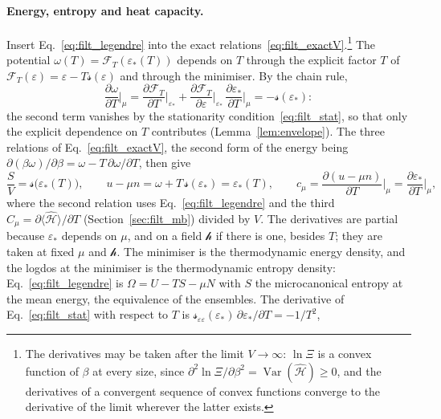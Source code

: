 \documentclass[10pt,a4paper]{article}
\theoremstyle{plain}
\newcommand{\Var}{\operatorname{Var}}
\newcommand{\lndos}{{logdos}}  %
\newcommand{\hfield}{\mathscr{h}}  %
\newcommand{\Fen}[1][T]{\mathscr{F}_{#1}}  %
\newcommand{\lds}{\mathscr{s}}  %
\begin{document}
\paragraph{Energy, entropy and heat capacity.} Insert
Eq.~\eqref{eq:filt_legendre} into the exact
relations~\eqref{eq:filt_exactV}.\footnote{The derivatives may be taken after
the limit $V\to\infty$: $\ln\Xi$ is a convex function of $\beta$ at every
size, since $\partial^{2}\ln\Xi/\partial\beta^{2}=\Var(\hat{\mathcal H})\ge0$,
and the derivatives of a convergent sequence of convex functions converge to
the derivative of the limit wherever the latter exists.}
The potential $\omega(T)=\Fen(\varepsilon_*(T))$ depends on $T$ through the
explicit factor $T$ of $\Fen(\varepsilon)=\varepsilon-T\lds(\varepsilon)$ and
through the minimiser. By the chain rule,
\begin{equation}\label{eq:filt_dwdT}
  \frac{\partial\omega}{\partial T}\bigg|_{\mu}
  =\frac{\partial\Fen}{\partial T}\bigg|_{\varepsilon_*}
  +\frac{\partial\Fen}{\partial\varepsilon}\bigg|_{\varepsilon_*}\,
  \frac{\partial\varepsilon_*}{\partial T}\bigg|_{\mu}
  =-\lds(\varepsilon_*) :
\end{equation}
the second term vanishes by the stationarity
condition~\eqref{eq:filt_stat}, so that only the explicit dependence on $T$
contributes (Lemma~\ref{lem:envelope}). The three relations of
Eq.~\eqref{eq:filt_exactV}, the second form of the energy being
$\partial(\beta\omega)/\partial\beta=\omega-T\,\partial\omega/\partial T$,
then give
\begin{equation}\label{eq:filt_SI}
  \frac{S}{V}=\lds\big(\varepsilon_*(T)\big) , \qquad
  u-\mu n=\omega+T\,\lds(\varepsilon_*)=\varepsilon_*(T) , \qquad
  c_\mu=\frac{\partial(u-\mu n)}{\partial T}\bigg|_{\mu}
  =\frac{\partial\varepsilon_*}{\partial T}\bigg|_{\mu} ,
\end{equation}
where the second relation uses Eq.~\eqref{eq:filt_legendre} and the third
$C_\mu=\partial\langle\hat{\mathcal H}\rangle/\partial T$
(Section~\ref{sec:filt_mb}) divided by $V$. The derivatives
are partial because $\varepsilon_*$ depends on $\mu$, and on a field
$\hfield$ if there is one, besides $T$; they are taken at fixed $\mu$ and
$\hfield$. The minimiser is the thermodynamic energy density, and the
\lndos{} at the minimiser is the thermodynamic entropy density:
Eq.~\eqref{eq:filt_legendre} is $\Omega=U-TS-\mu N$ with $S$ the
microcanonical entropy at the mean energy, the equivalence of the ensembles.
The derivative of Eq.~\eqref{eq:filt_stat} with respect to $T$ is
$\lds_{\varepsilon\varepsilon}(\varepsilon_*)\,\partial\varepsilon_*/\partial T=-1/T^{2}$,
\end{document}
